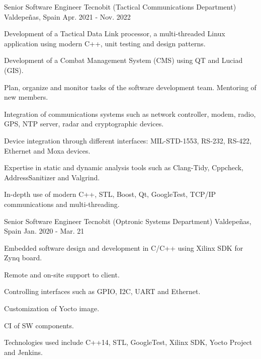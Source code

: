 

\begin{cventries}

  \cventry
    {Senior Software Engineer} %
    {Tecnobit (Tactical Communications Department)} %
    {Valdepeñas, Spain} %
    {Apr. 2021 - Nov. 2022} %
    {
      \begin{cvitems} %
        \item {Development of a Tactical Data Link processor, a multi-threaded Linux application using modern C++, unit testing and design patterns.}
        \item {Development of a Combat Management System (CMS) using QT and Luciad (GIS).}
        \item {Plan, organize and monitor tasks of the software development team. Mentoring of new members.}
        \item {Integration of communications systems such as network controller, modem, radio, GPS, NTP server, radar and cryptographic devices.}
        \item {Device integration through different interfaces: MIL-STD-1553, RS-232, RS-422, Ethernet and Moxa devices.}
        \item {Expertise in static and dynamic analysis tools such as Clang-Tidy, Cppcheck, AddressSanitizer and Valgrind. }
        \item {In-depth use of modern C++, STL, Boost, Qt, GoogleTest, TCP/IP communications and multi-threading.}
      \end{cvitems}
    }

  \cventry
    {Senior Software Engineer} %
    {Tecnobit (Optronic Systems Department)} %
    {Valdepeñas, Spain} %
    {Jan. 2020 - Mar. 21} %
    {
      \begin{cvitems} %
        \item {Embedded software design and development in C/C++ using Xilinx SDK for Zynq board.}
        \item {Remote and on-site support to client.}
        \item {Controlling interfaces such as GPIO, I2C, UART and Ethernet.}
        \item {Customization of Yocto image.}
        \item {CI of SW components.}
        \item {Technologies used include C++14, STL, GoogleTest, Xilinx SDK, Yocto Project and Jenkins.}
      \end{cvitems}
    }


\end{cventries}
